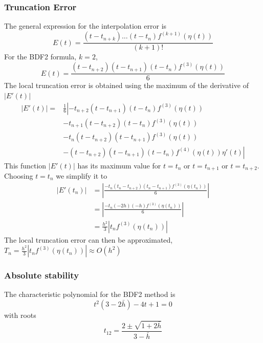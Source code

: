 \documentclass[a4paper, 11pt]{article}
\begin{document}
			\subsubsection*{Truncation Error}
				The general expression for the interpolation error is 
				\begin{equation}
					E(t) = \frac{(t - t_{n+k})\ldots(t - t_{n})f^{(k+1)}(\eta(t))}{(k+1)!}
				\end{equation}
				For the BDF2 formula, $ k = 2 $,
				\begin{equation}
					E(t) = \frac{(t - t_{n+2})(t - t_{n+1})(t - t_{n})f^{(3)}(\eta(t))}{6}
				\end{equation}
				The local truncation error is obtained using the maximum of the derivative of $|E'(t)|$
				\begin{align}
					\left| E'(t) \right| = &\frac{1}{6} \left| -t_{n+2}(t - t_{n+1})(t - t_{n})f^{(3)}(\eta(t)) \right. \\
					 		& \left. -t_{n+1}(t - t_{n+2})(t - t_{n})f^{(3)}(\eta(t)) \right. \\
					 		& \left. -t_{n}(t - t_{n+2})(t - t_{n+1})f^{(3)}(\eta(t)) \right. \\
					 		& \left. -(t - t_{n+2})(t - t_{n+1})(t - t_{n})f^{(4)}(\eta(t))\eta'(t) \right|
				\end{align}
				This function $|E'(t)|$ has its maximum value for $ t = t_n$ or $ t = t_{n+1}$ or $ t = t_{n+2}$.
				Choosing $t = t_{n}$ we simplify it to
				\begin{align}
					|E'(t_{n})| &= \left|\frac{- t_{n}(t_{n} - t_{n+2})(t_{n} - t_{n+1})f^{(3)}(\eta(t_{n}))}{6}\right| \\
							&= \left|\frac{- t_{n}(-2h)(-h)f^{(3)}(\eta(t_{n}))}{6}\right| \\
							&= \frac{h^2}{3}\left|t_nf^{(3)}(\eta(t_n))\right| 
				\end{align}
				The local truncation error can then be approximated, $T_n = \frac{h^2}{3}\left|t_nf^{(3)}(\eta(t_n))\right| \approx O(h^2) $
			
			\subsubsection*{Absolute stability}
				The characteristic polynomial for the BDF2 method is
				\begin{equation}
					t^2 (3 - 2 \bar{h}) - 4t + 1 = 0
				\end{equation}
				with roots
				\begin{equation}
					t_{12} =  \frac{2 \pm \sqrt{1+2\bar{h}}}{3-\bar{h}}
				\end{equation}
				
\end{document}
